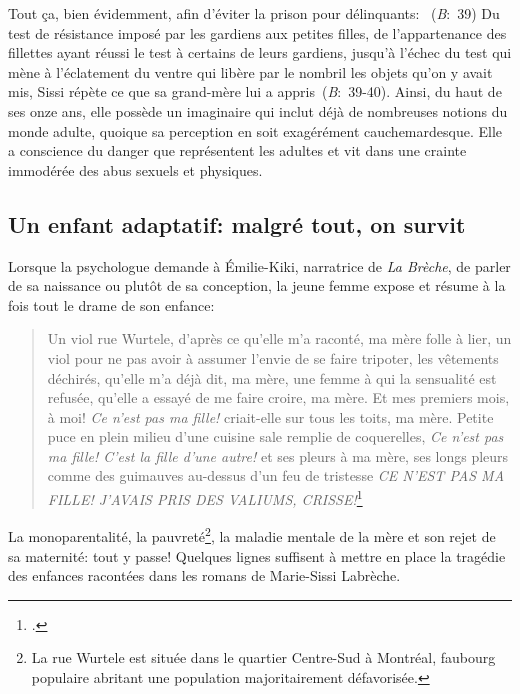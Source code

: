 Tout ça, bien évidemment, afin d'éviter la prison pour délinquants: ~(\textit{B}:~39)
Du test de résistance imposé par les gardiens aux petites filles, de l'appartenance des fillettes ayant réussi le test à certains de leurs gardiens, jusqu'à l'échec du test qui mène à l'éclatement du ventre qui libère par le nombril les objets qu'on y avait mis, Sissi répète ce que sa grand-mère lui a appris~(\textit{B}:~39-40).
Ainsi, du haut de ses onze ans, elle possède un imaginaire qui inclut déjà de nombreuses notions du monde adulte, quoique sa perception en soit exagérément cauchemardesque.
Elle a conscience du danger que représentent les adultes et vit dans une crainte immodérée des abus sexuels et physiques.


\subsection{Un enfant adaptatif: malgré tout, on survit}
Lorsque la psychologue demande à Émilie-Kiki, narratrice de \textit{La Brèche}, de parler de sa naissance ou plutôt de sa conception, la jeune femme expose et résume à la fois tout le drame de son enfance:
\begin{quote}
  \begin{singlespace}
    \small
    Un viol rue Wurtele, d'après ce qu'elle m'a raconté, ma mère folle à lier, un viol pour ne pas avoir à assumer l'envie de se faire tripoter, les vêtements déchirés, qu'elle m'a déjà dit, ma mère, une femme à qui la sensualité est refusée, qu'elle a essayé de me faire croire, ma mère. Et mes premiers mois, à moi! \textit{Ce n'est pas ma fille!} criait-elle sur tous les toits, ma mère. Petite puce en plein milieu d'une cuisine sale remplie de coquerelles, \textit{Ce n'est pas ma fille! C'est la fille d'une autre!} et ses pleurs à ma mère, ses longs pleurs comme des guimauves au-dessus d'un feu de tristesse \textit{CE N'EST PAS MA FILLE! J'AVAIS PRIS DES VALIUMS, CRISSE!}\footcite[38]{Labreche2008}
    \normalsize
  \end{singlespace}
\end{quote}
La monoparentalité, la pauvreté\footnote{La rue Wurtele est située dans le quartier Centre-Sud à Montréal, faubourg populaire abritant une population majoritairement défavorisée.}, la maladie mentale de la mère et son rejet de sa maternité: tout y passe!
Quelques lignes suffisent à mettre en place la tragédie des enfances racontées dans les romans de Marie-Sissi Labrèche.
